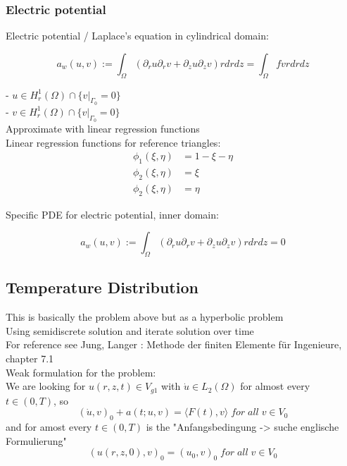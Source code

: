 \documentclass[parskip=half, titlepage=yes, 12pt, BCOR=12mm, DIV=calc]{scrartcl}
\begin{document}
\subsubsection{Electric potential}

Electric potential / Laplace's equation in cylindrical domain:

\begin{equation}
    a_w(u,v) := \int_{\Omega} (\partial_r u \partial_r v + \partial_z u \partial_z v) r drdz = \int_{\Omega} f v r dr dz
\end{equation}

- $u \in H_r^1(\Omega) \cap \{v|_{\Gamma_{0}} = 0 \} $ \\
- $v \in H_r^1(\Omega) \cap \{v|_{\Gamma_{0}} = 0 \} $ \\

Approximate with linear regression functions\\
Linear regression functions for reference triangles:
\begin{align}
    \phi_1(\xi, \eta) &= 1 - \xi - \eta \\
    \phi_2(\xi, \eta) &= \xi \\
    \phi_2(\xi, \eta) &= \eta 
\end{align}

Specific PDE for electric potential, inner domain: 

\begin{equation}
    a_w(u,v) := \int_{\Omega} (\partial_r u \partial_r v + \partial_z u \partial_z v) r drdz = 0 
\end{equation}

\subsection{Temperature Distribution}

This is basically the problem above but as a hyperbolic problem \\
Using semidiscrete solution and iterate solution over time \\
For reference see Jung, Langer : Methode der finiten Elemente für Ingenieure, chapter 7.1 \\

Weak formulation for the problem: \\

We are looking for $u(r,z,t) \in V_{g1}$ with $\Dot{u} \in L_2(\Omega)$ for almost every $t \in (0,T)$, so \\ \begin{equation}
(\Dot{u},v)_0 + a(t;u,v) = \langle F(t),v \rangle \; for \; all \; v \in V_0    
\end{equation}
and for amost every $t \in (0, T)$ is the "Anfangsbedingung -> suche englische Formulierung"
\begin{equation}
    (u(r,z,0),v)_0 = (u_0,v)_0 \; for \; all \; v \in V_0
\end{equation}
\end{document}
